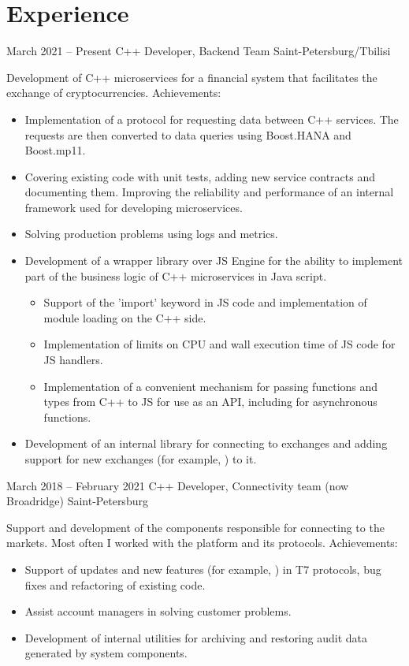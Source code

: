 \documentclass[11pt,a4paper,sans]{moderncv}
\begin{document}
\makecvtitle

\section{Experience}
\cventry
{March 2021 -- Present}
{C++ Developer, Backend Team}
{}
{Saint-Petersburg/Tbilisi}
{}
{Development of C++ microservices for a financial system that facilitates the exchange of cryptocurrencies.\newline{}
Achievements:
\begin{itemize}
\item Implementation of a protocol for requesting data between C++ services. The requests are then converted to data queries using Boost.HANA and Boost.mp11.
\item Covering existing code with unit tests, adding new service contracts and documenting them. Improving the reliability and performance of an internal framework used for developing microservices.
\item Solving production problems using logs and metrics.
\item Development of a wrapper library over  JS Engine for the ability to implement part of the business logic of C++ microservices in Java script.
  \begin{itemize}
  \item Support of the 'import' keyword in JS code and implementation of module loading on the C++ side.
  \item Implementation of limits on CPU and wall execution time of JS code for JS handlers.
  \item Implementation of a convenient mechanism for passing functions and types from C++ to JS for use as an API, including for asynchronous functions.
  \end{itemize}
\item Development of an internal library for connecting to exchanges and adding support for new exchanges (for example, ) to it.
\end{itemize}}

\cventry
{March 2018 -- February 2021}
{C++ Developer, Connectivity team}
{(now Broadridge)}
{Saint-Petersburg}
{}
{Support and development of the components responsible for connecting to the markets. Most often I worked with the  platform and its protocols.\newline{}
Achievements:
\begin{itemize}
\item Support of updates and new features (for example, ) in T7 protocols, bug fixes and refactoring of existing code.
\item Assist account managers in solving customer problems.
\item Development of internal utilities for archiving and restoring audit data generated by system components.
\end{itemize}}
\end{document}
